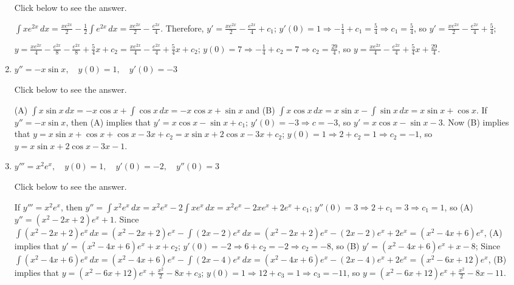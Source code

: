 \documentclass{ximera}
\begin{document}
\begin{problem}
\begin{enumerate}
Click below to see the answer.

\begin{expandable}
    $\int xe^{2x}\,dx=\frac{xe^{2x}}{2}-\frac{1}{2}
\int e^{2x}\,dx=\frac{xe^{2x}}{2}-\frac{e^{2x}}{4}$. Therefore,
$y'=\frac{xe^{2x}}{2}-\frac{e^{2x}}{4}+c_1$; $y'(0)=1\Rightarrow
-\frac{1}{4}+c_1=\frac{5}{4}\Rightarrow c_1=\frac{5}{4}$,
so $y'=\frac{xe^{2x}}{2}-\frac{e^{2x}}{4}+\frac{5}{4}$;

$y=\frac{xe^{2x}}{4}-\frac{e^{2x}}{8}-\frac{e^{2x}}{8}+\frac{5}{4}x+c_2
=\frac{xe^{2x}}{4}-\frac{e^{2x}}{4}+\frac{5}{4}x+c_2$; $y(0)=7
\Rightarrow-\frac{1}{4}+c_2=7\Rightarrow c_2=\frac{29}{4}$, so
$y=\frac{xe^{2x}}{4}-\frac{e^{2x}}{4}+\frac{5}{4}x+\frac{29}{4}$.
\end{expandable}

\item %
$y''=- x \sin x, \quad y(0)=1, \quad y'(0)=-3$

Click below to see the answer.

\begin{expandable}
   (A) $\int x\sin x\,dx=-x\cos x+\int \cos x\,dx=-x\cos x+\sin
x$ and (B) $\int x\cos x\,dx=x\sin x-\int\sin x\,dx=x\sin x+\cos x$.
If $y''=-x\sin x$, then (A) implies that $y'=x\cos x-\sin x+c_1$;
$y'(0)=-3\Rightarrow c=-3$, so $y'=x\cos x-\sin x-3$. Now (B) implies
that $y=x\sin x+\cos x+\cos x-3x+c_2=x\sin x+2\cos x-3x+c_2$;
$y(0)=1\Rightarrow 2+c_2=1\Rightarrow c_2=-1$, so $y=x \sin x+2 \cos x-3x-1$.
\end{expandable}

\item %
$y'''=x^2e^x, \quad y(0)=1, \quad y'(0)=-2, \quad
y''(0)=3$

Click below to see the answer.

\begin{expandable}
    If $y'''=x^2e^x$, then $y''=\int x^2e^x\,dx=x^2e^x-2\int
xe^x\,dx=x^2e^x-2xe^x+2e^x+c_1$; $y''(0)=3\Rightarrow
2+c_1=3\Rightarrow c_1=1$, so (A) $y''=(x^2-2x+2)e^x+1$. Since $\int
(x^2-2x+2)e^x\,dx=(x^2-2x+2)e^x-\int (2x-2)e^x\,dx
=(x^2-2x+2)e^x-(2x-2)e^x+2e^x=(x^2-4x+6)e^x$, (A) implies that
$y'=(x^2-4x+6)e^x+x+c_2$; $y'(0)=-2\Rightarrow 6+c_2=-2\Rightarrow
c_2=-8$, so (B) $y'=(x^2-4x+6)e^x+x-8$; Since $\int
(x^2-4x+6)e^x\,dx=(x^2-4x+6)e^x-\int (2x-4)e^x\,dx
=(x^2-4x+6)e^x-(2x-4)e^x+2e^x=(x^2-6x+12)e^x$, (B) implies that
$y=(x^2-6x+12)e^x+\frac{x^2}{2}-8x+c_3$; $y(0)=1\Rightarrow
12+c_3=1\Rightarrow c_3=-11$, so
$y=(x^2-6x+12)e^x+\frac{x^2}{2}-8x-11$.
\end{expandable}


\end{enumerate}
\end{problem}
\end{document}
